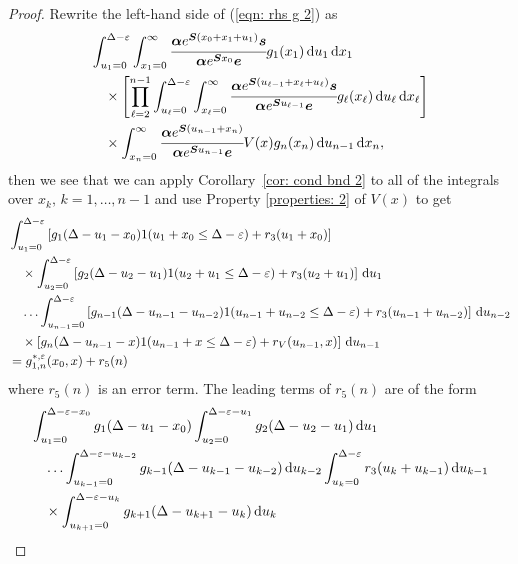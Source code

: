 \begin{proof}
	Rewrite the left-hand side of (\ref{eqn: rhs g 2}) as 
	\begin{align*}
		& \int_{u_1=0}^{\Delta-\varepsilon} \int_{x_1=0}^\infty \cfrac{\boldsymbol \alpha e^{\boldsymbol{S}(x_{0}+x_1+u_1)}\boldsymbol s}{\boldsymbol \alpha e^{\boldsymbol{S}x_0}\boldsymbol e}g_1(x_1) \, \mathrm{d} u_1\, \mathrm{d} x_1 \nonumber 
		\\&{}\quad\times\left[\prod_{\ell=2}^{n-1}\int_{u_\ell=0}^{\Delta-\varepsilon} \int_{x_\ell=0}^\infty \cfrac{\boldsymbol \alpha e^{\boldsymbol{S}(u_{\ell-1}+x_\ell+u_\ell)}\boldsymbol s}{\boldsymbol \alpha e^{\boldsymbol{S}u_{\ell-1}}\boldsymbol e}g_\ell(x_\ell) \, \mathrm{d} u_\ell\, \mathrm{d} x_\ell \right]
            	\\&{}\quad\times\int_{x_n=0}^\infty \cfrac{\boldsymbol \alpha e^{\boldsymbol{S}(u_{n-1}+x_n )}}{\boldsymbol \alpha e^{\boldsymbol{S}u_{n-1}}\boldsymbol e} V(x)g_{n}(x_n)\, \mathrm{d} u_{n-1} \, \mathrm{d} x_n,
	\end{align*}
	then we see that we can apply Corollary~\ref{cor: cond bnd 2} to all of the integrals over \(x_k,\, k=1,\dots,n-1\) and use Property \ref{properties: 2} of \(V(x)\) to get  
	\begin{align*}
		& \int_{u_1=0}^{\Delta-\varepsilon}\left[g_1(\Delta - u_1 - x_0)1(u_1 + x_0\leq \Delta - \varepsilon) + r_3 (u_1 + x_0)\right]
		\\&\quad\times\int_{u_2=0}^{\Delta-\varepsilon}\left[g_2(\Delta - u_2 - u_1)1(u_2 + u_1\leq \Delta - \varepsilon) + r_3 (u_2 + u_1)\right]\, \mathrm{d} u_1
		\\&\quad\hdots 
            	 \int_{u_{n-1}=0}^{\Delta-\varepsilon}  \left[g_{n-1}(\Delta - u_{n-1} - u_{n-2}) 1(u_{n-1} + u_{n-2}\leq \Delta - \varepsilon) +   r_3 (u_{n-1} + u_{n-2})\right] \, \mathrm{d} u_{n-2}
            	\\&\quad\times\left[g_{n}(\Delta-u_{n-1}-x)1(u_{n-1}+x\leq \Delta - \varepsilon) + r_V (u_{n-1},x)\right]\, \mathrm{d} u_{n-1}
		\\&=g^{*,\varepsilon}_{1,n}(x_0,x) + r_5(n)
	\end{align*}
	where \(r_5(n)\) is an error term. The leading terms of \(r_5(n)\) are of the form 
	\begin{align*}
		&\int_{u_1=0}^{\Delta-\varepsilon-x_0}g_1(\Delta - u_1 - x_0)
		\int_{u_2=0}^{\Delta-\varepsilon-u_1}g_2(\Delta - u_2 - u_1)\wrt u_1
		\\&\quad\hdots\int_{u_{k-1}=0}^{\Delta-\varepsilon-u_{k-2}}g_{k-1}(\Delta - u_{k-1} - u_{k-2}) \wrt u_{k-2}
		\int_{u_k=0}^{\Delta-\varepsilon}r_3(u_{k}+u_{k-1}) \wrt u_{k-1}
		\\&\quad\times\int_{u_{k+1}=0}^{\Delta-\varepsilon-u_{k}}g_{k+1}(\Delta - u_{k+1} - u_{k}) \wrt u_{k}

\end{align*}
\end{proof}
